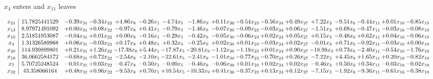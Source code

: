 \documentclass[9pt]{article}
\begin{document}
 $ x_{4} $ enters and $ x_{11} $ leaves 

 \[\begin{array}{c| c c@{\hskip 2pt} c@{\hskip 2pt} c@{\hskip 2pt} c@{\hskip 2pt} c@{\hskip 2pt} c@{\hskip 2pt} c@{\hskip 2pt} c@{\hskip 2pt} c@{\hskip 2pt} c@{\hskip 2pt} c@{\hskip 2pt} c@{\hskip 2pt} c@{\hskip 2pt} c@{\hskip 2pt} c@{\hskip 2pt} }
 x_{21}   &  15.7825441529 & -0.39 x_{31} & -0.34 x_{22} & +  4.86 x_{8} & -0.26 x_{1} & -4.74 x_{5} & -1.86 x_{9} & +  0.11 x_{30} & -0.54 x_{23} & -0.56 x_{24} & +  0.49 x_{27} & +  7.22 x_{3} & -9.51 x_{6} & -0.44 x_{11} & +  0.01 x_{16} & -0.85 x_{19}\\
 x_{13}   &  8.97971491092 & +  0.00 x_{31} & +  0.08 x_{22} & -0.97 x_{8} & +  0.41 x_{1} & -0.79 x_{5} & -1.46 x_{9} & -0.07 x_{30} & -0.09 x_{23} & -0.03 x_{24} & +  0.06 x_{27} & -1.51 x_{3} & +  0.68 x_{6} & -0.47 x_{11} & -0.03 x_{16} & -0.08 x_{19}\\
 x_{10}   &  2.51851953087 & -0.04 x_{31} & +  0.01 x_{22} & +  0.00 x_{8} & -0.16 x_{1} & -0.29 x_{5} & -0.42 x_{9} & -0.05 x_{30} & -0.06 x_{23} & +  0.02 x_{24} & +  0.05 x_{27} & +  0.15 x_{3} & -0.48 x_{6} & +  0.62 x_{11} & +  0.04 x_{16} & -0.06 x_{19}\\
 x_{4}   &  1.31326589968 & +  0.06 x_{31} & -0.03 x_{22} & +  0.17 x_{8} & +  0.48 x_{1} & +  0.32 x_{5} & -0.25 x_{9} & +  0.02 x_{30} & +  0.01 x_{23} & -0.03 x_{24} & +  0.02 x_{27} & -0.01 x_{3} & +  0.71 x_{6} & -0.92 x_{11} & -0.03 x_{16} & +  0.00 x_{19}\\
 x_{20}   &  114.939899801 & +  0.21 x_{31} & +  1.26 x_{22} & -17.38 x_{8} & +  5.44 x_{1} & -17.87 x_{5} & -20.81 x_{9} & -1.12 x_{30} & -1.18 x_{23} & +  0.01 x_{24} & +  0.90 x_{27} & -18.98 x_{3} & +  0.73 x_{6} & -2.40 x_{11} & -0.54 x_{16} & -1.76 x_{19}\\
 x_{18}   &  36.0662584172 & -0.68 x_{31} & +  0.72 x_{22} & -2.54 x_{8} & -2.10 x_{1} & -22.61 x_{5} & -2.41 x_{9} & -1.01 x_{30} & -0.77 x_{23} & -0.70 x_{24} & +  0.26 x_{27} & -7.22 x_{3} & +  4.45 x_{6} & +  1.65 x_{11} & +  0.20 x_{16} & -0.82 x_{19}\\
 x_{7}   &  5.70725248524 & -0.01 x_{31} & +  0.03 x_{22} & -0.47 x_{8} & -0.50 x_{1} & -0.00 x_{5} & -0.46 x_{9} & -0.06 x_{30} & +  0.01 x_{23} & +  0.02 x_{24} & +  0.02 x_{27} & -0.46 x_{3} & +  0.50 x_{6} & +  0.34 x_{11} & -0.03 x_{16} & -0.02 x_{19}\\
 x_{32}   &  43.358066164 & +  0.48 x_{31} & +  0.96 x_{22} & -9.53 x_{8} & +  0.70 x_{1} & + 10.54 x_{5} & -10.33 x_{9} & +  0.41 x_{30} & -0.37 x_{23} & +  0.13 x_{24} & +  0.12 x_{27} & -7.15 x_{3} & -1.92 x_{6} & -9.36 x_{11} & -0.61 x_{16} & -0.38 x_{19}\\

\end{array}\]
\end{document}
